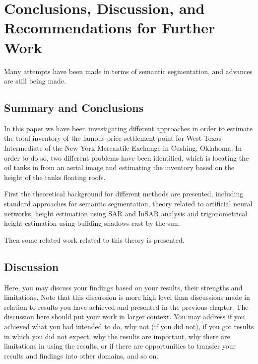 \chapter[Conclusions]{Conclusions, Discussion, and Recommendations for Further Work}

Many attempts have been made in terms of semantic segmentation, and advances are still being made. 


\section{Summary and Conclusions}


In this paper we have been investigating different approaches in order to estimate the total inventory of the famous price settlement point for West Texas Intermediate of the New York Mercantile Exchange in Cushing, Oklahoma. In order to do so, two different problems have been identified, which is locating the oil tanks in from an aerial image and estimating the inventory based on the height of the tanks floating roofs.

First the theoretical background for different methods are presented, including standard approaches for semantic segmentation, theory related to artificial neural networks, height estimation using SAR and InSAR analysis and trigonometrical height estimation using building shadows cast by the sun.

Then some related work related to this theory is presented.

\section{Discussion}
Here, you may discuss your findings based on your results, their strengths and limitations. Note that this discussion is more high level than discussions made in relation to results you have achieved and presented in the previous chapter. The discussion here should put your work in larger context. You may address if you achieved what you had intended to do, why not (if you did not), if you got results in which you did not expect, why the results are important, why there are limitations in using the results, or if there are opportunities to transfer your results and findings into other domains, and so on.
